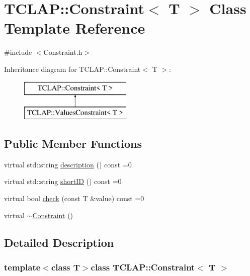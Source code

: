 \hypertarget{class_t_c_l_a_p_1_1_constraint}{}\section{T\+C\+L\+A\+P\+:\+:Constraint$<$ T $>$ Class Template Reference}
\label{class_t_c_l_a_p_1_1_constraint}


{\ttfamily \#include $<$Constraint.\+h$>$}

Inheritance diagram for T\+C\+L\+A\+P\+:\+:Constraint$<$ T $>$\+:\begin{figure}[H]
\begin{center}
\leavevmode
\includegraphics[height=2.000000cm]{class_t_c_l_a_p_1_1_constraint}
\end{center}
\end{figure}
\subsection*{Public Member Functions}
\begin{DoxyCompactItemize}
\item 
virtual std\+::string \hyperlink{class_t_c_l_a_p_1_1_constraint_a77a9676c8deb6714e14d593705ec9a5b}{description} () const  =0
\item 
virtual std\+::string \hyperlink{class_t_c_l_a_p_1_1_constraint_a1a08f9b01dfdcceef61015c64b1e9187}{short\+I\+D} () const  =0
\item 
virtual bool \hyperlink{class_t_c_l_a_p_1_1_constraint_ac6f2532fdfb962949fa5d509d42eaec8}{check} (const T \&value) const  =0
\item 
virtual \hyperlink{class_t_c_l_a_p_1_1_constraint_ae96bbe5301e9517b68b1597b36098224}{$\sim$\+Constraint} ()
\end{DoxyCompactItemize}


\subsection{Detailed Description}
\subsubsection*{template$<$class T$>$class T\+C\+L\+A\+P\+::\+Constraint$<$ T $>$}

